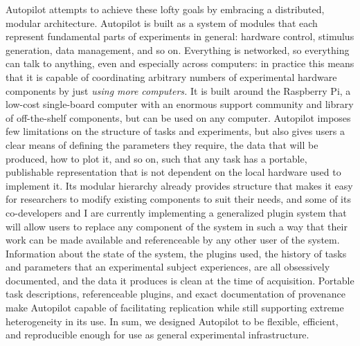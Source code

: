 \documentclass[nohyper]{tufte-book-jls}
\begin{document}
Autopilot attempts to achieve these lofty goals by embracing a
distributed, modular architecture. Autopilot is built as a system of
modules that each represent fundamental parts of experiments in general:
hardware control, stimulus generation, data management, and so on.
Everything is networked, so everything can talk to anything, even and
especially across computers: in practice this means that it is capable
of coordinating arbitrary numbers of experimental hardware components by
just \emph{using more computers.} It is built around the Raspberry Pi, a
low-cost single-board computer with an enormous support community and
library of off-the-shelf components, but can be used on any computer.
Autopilot imposes few limitations on the structure of tasks and
experiments, but also gives users a clear means of defining the
parameters they require, the data that will be produced, how to plot it,
and so on, such that any task has a portable, publishable representation
that is not dependent on the local hardware used to implement it. Its
modular hierarchy already provides structure that makes it easy for
researchers to modify existing components to suit their needs, and some
of its co-developers and I are currently implementing a generalized
plugin system that will allow users to replace any component of the
system in such a way that their work can be made available and
referenceable by any other user of the system. Information about the
state of the system, the plugins used, the history of tasks and
parameters that an experimental subject experiences, are all obsessively
documented, and the data it produces is clean at the time of
acquisition. Portable task descriptions, referenceable plugins, and
exact documentation of provenance make Autopilot capable of facilitating
replication while still supporting extreme heterogeneity in its use. In
sum, we designed Autopilot to be flexible, efficient, and reproducible
enough for use as general experimental infrastructure.
\end{document}
